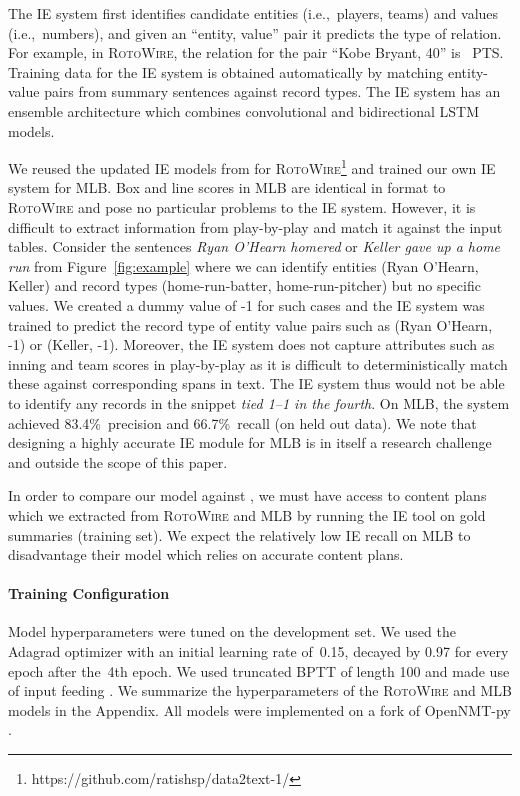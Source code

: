 \documentclass[11pt,a4paper]{article}
\newcommand{\lform}[1]{\textsf{\scriptsize{#1}}}
\begin{document}
The IE system first identifies candidate entities (i.e.,~players,
teams) and values (i.e.,~numbers), and given an ``entity, value'' pair
it predicts the type of relation. For example, in \textsc{RotoWire},
the relation for the pair ``Kobe Bryant, 40'' is~\lform{\small
  PTS}. Training data for the IE system is obtained automatically by
matching entity-value pairs from summary sentences against record
types.  The IE system has an ensemble architecture which combines
convolutional and bidirectional LSTM models.

We reused the updated IE models from
\citet{DBLP:journals/corr/abs-1809-00582} for
\textsc{RotoWire}\footnote{https://github.com/ratishsp/data2text-1/}
and trained our own IE system for MLB.  Box and line scores in MLB are
identical in format to \textsc{RotoWire} and pose no particular
problems to the IE system. However, it is difficult to extract
information from play-by-play and match it against the input tables.
Consider the sentences \textsl{Ryan O'Hearn homered} or \textsl{Keller
  gave up a home run} from Figure~\ref{fig:example} where we can
identify entities (Ryan O'Hearn, Keller) and record types
(home-run-batter, home-run-pitcher) but no specific values.  We
created a dummy value of -1 for such cases and the IE system was
trained to predict the record type of entity value pairs such as (Ryan
O'Hearn, -1) or (Keller, -1). Moreover, the IE system does not capture
attributes such as inning and team scores in play-by-play as it is
difficult to deterministically match these against corresponding spans
in text.  The IE system thus would not be able to identify any records
in the snippet \textsl{tied 1--1 in the fourth}.  On MLB, the system
achieved 83.4\%~precision and 66.7\%~recall (on held out data). We
note that designing a highly accurate IE module for MLB is in itself a
research challenge and outside the scope of this paper.

In order to compare our model against
, we must have access to
content plans which we extracted from \textsc{RotoWire} and MLB by
running the IE tool on gold summaries (training set). We expect the
relatively low IE recall on MLB to disadvantage their model which
relies on accurate content plans.


\paragraph{Training Configuration}
Model hyperparameters were tuned on the development set.  We used the
Adagrad optimizer \cite{DBLP:journals/jmlr/DuchiHS11} with an initial
learning rate of~0.15, decayed by 0.97 for every epoch after the~4th
epoch.  We used truncated BPTT \cite{DBLP:journals/neco/WilliamsP90}
of length 100 and made use of input feeding \cite{D15-1166}.  We
summarize the hyperparameters of the \textsc{RotoWire} and MLB models
in the Appendix. All models were implemented on a fork of OpenNMT-py
\cite{P17-4012}.
\end{document}
